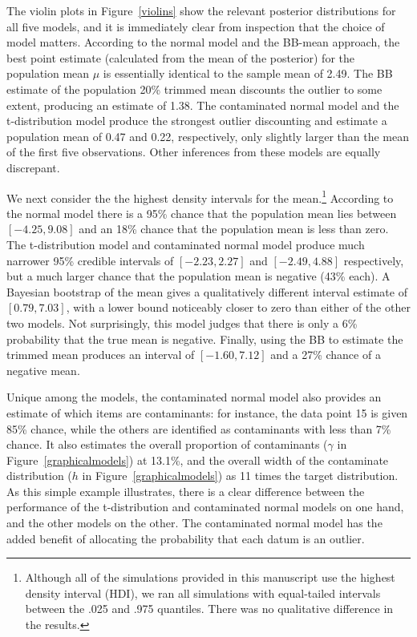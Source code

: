 \documentclass[doc]{apa6}
\begin{document}
{The violin plots in Figure~\ref{violins} show the relevant posterior distributions for all     five   models, and it is immediately clear from inspection that the choice of model matters. According to the normal model and the BB-mean approach, the best point estimate   (calculated from the mean of the posterior)   for the population mean $\mu$ is essentially identical to the sample mean of 2.49.   The BB estimate of the population 20\% trimmed mean discounts the outlier to some extent, producing an estimate of   1.38.   The contaminated normal model   and the t-distribution model   produce       the strongest outlier discounting and estimate       a population mean of   0.47 and 0.22, respectively,   only slightly larger than the mean of the first five observations. Other inferences from these models are equally discrepant.

We next consider the the highest density intervals for the mean.\footnote{  Although all of the simulations provided in this manuscript use the highest density interval (HDI), we ran all simulations with equal-tailed intervals between the .025 and .975 quantiles. There was no qualitative difference in the results.}   According to the normal model there is a 95\% chance that the population mean lies between   $[-4.25,9.08]$   and an 18\% chance that the population mean is less than zero. The   t-distribution model and   contaminated normal model produce     much narrower 95\% credible intervals of  $[-2.23 , 2.27]$ and $[-2.49, 4.88]$ respectively,    but a much larger chance that the population mean is negative (43\% each).   A Bayesian bootstrap of the mean gives a qualitatively different interval estimate of   $[0.79 ,7.03]$,   with a lower bound noticeably closer to zero than either of the other two models. Not surprisingly, this model judges that there is only a 6\% probability that the true mean is negative. Finally, using the BB to estimate the trimmed mean produces an interval of   $[-1.60, 7.12]$   and a 27\% chance of a negative mean.

 Unique among the models, the contaminated normal model also provides an estimate of which items are contaminants: for instance, the data point 15 is given 85\% chance, while the others are identified as contaminants with less than 7\% chance. It also estimates the overall proportion of contaminants ($\gamma$ in Figure~\ref{graphicalmodels}) at 13.1\%, and the overall width of the contaminate distribution ($h$ in Figure~\ref{graphicalmodels}) as 11 times the target distribution.   As this simple example illustrates, there is   a clear difference between the performance of the t-distribution and contaminated normal models on one hand, and the other models on the other. The contaminated normal model has the added benefit of allocating the probability that each datum is an outlier.

}
\end{document}
